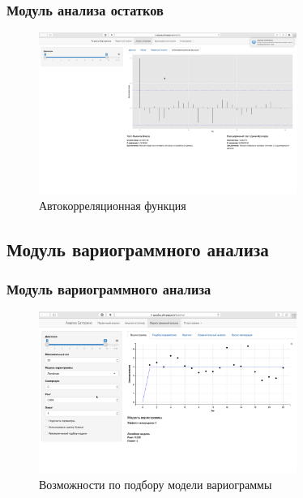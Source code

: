 \documentclass[10pt,pdf,aspectratio=169,hyperref={unicode}]{beamer}
\begin{document}
\begin{frame}
  \frametitle{Модуль анализа остатков}
    \begin{figure}[h]
    \includegraphics[width=0.75\textwidth]{../../figures/static/3_acf.png}
    \caption{Автокорреляционная функция}
  \end{figure}
\end{frame}

\subsection{Модуль вариограммного анализа}

\begin{frame}
  \frametitle{Модуль вариограммного анализа}
    \begin{figure}[h]
    \includegraphics[width=0.75\textwidth]{../../figures/static/4_variogram.png}
    \caption{Возможности по подбору модели вариограммы}
  \end{figure}
\end{frame}
\end{document}

